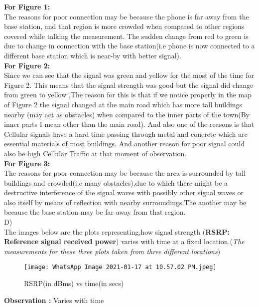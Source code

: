 \documentclass[11pt,a4paper]{article}
\begin{document}
 \vspace{0.5cm}
\textbf{\Large{For Figure 1:}}\\
 The reasons for poor connection may be because the phone is far away from the base station, and that region is more crowded when compared to other regions covered while talking the measurement. The sudden change from red to green is due to change in connection with the base station(i.e phone is now connected to a different base station which is near-by with better signal).
\\
\newpage
\textbf{\Large{For Figure 2:}}\\
Since we can see that the signal was green and yellow for the most of 
the time for Figure 2. This means that the signal strength 
was good but the signal did change from green to yellow ,The reason for this is that if we
notice properly in the map of Figure 2 the signal changed at the main road which has more tall
buildings nearby (may act as obstacles) when compared to the inner parts of the town(By inner parts I mean other than the main road). And also one of the
reasons is that  Cellular signals have a hard time passing through metal and concrete which are essential materials of most buildings. And another reason for poor signal could also be high Cellular Traffic at that moment of observation.\\
\vspace{8pt}
\textbf{\Large{For Figure 3:}}\\
 The reasons for poor connection may be because the area is surrounded by tall buildings and crowded(i.e many obstacles),due to which there might be a destructive interference of the signal waves with possibly other signal waves or also itself by means of reflection with nearby surroundings.The another may be because the base station may be far away from that region.
\vspace{1cm}\\
{\huge D)}\\
\vspace{0.5cm}
The images below are the plots representing,how signal strength (\textbf{RSRP: Reference signal received power}) varies with time at a fixed location.(\textit{The measurements for these three plots taken from three different locations})\\
\begin{SCfigure}[0.5][h]
    \centering
\caption{RSRP(in dBms) vs time(in secs)}
\texttt{[image: WhatsApp Image 2021-01-17 at 10.57.02 PM.jpeg]}
\end{SCfigure}
\vspace{0.5cm}
\textbf{Observation : } Varies with time
\end{document}
